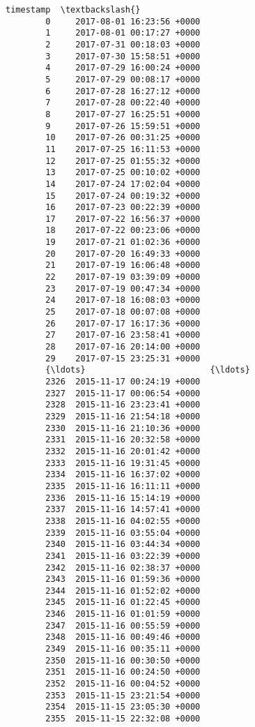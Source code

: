 \documentclass[11pt]{article}
\begin{document}
\begin{Verbatim}[commandchars=\\\{\}]
                              timestamp  \textbackslash{}
        0     2017-08-01 16:23:56 +0000   
        1     2017-08-01 00:17:27 +0000   
        2     2017-07-31 00:18:03 +0000   
        3     2017-07-30 15:58:51 +0000   
        4     2017-07-29 16:00:24 +0000   
        5     2017-07-29 00:08:17 +0000   
        6     2017-07-28 16:27:12 +0000   
        7     2017-07-28 00:22:40 +0000   
        8     2017-07-27 16:25:51 +0000   
        9     2017-07-26 15:59:51 +0000   
        10    2017-07-26 00:31:25 +0000   
        11    2017-07-25 16:11:53 +0000   
        12    2017-07-25 01:55:32 +0000   
        13    2017-07-25 00:10:02 +0000   
        14    2017-07-24 17:02:04 +0000   
        15    2017-07-24 00:19:32 +0000   
        16    2017-07-23 00:22:39 +0000   
        17    2017-07-22 16:56:37 +0000   
        18    2017-07-22 00:23:06 +0000   
        19    2017-07-21 01:02:36 +0000   
        20    2017-07-20 16:49:33 +0000   
        21    2017-07-19 16:06:48 +0000   
        22    2017-07-19 03:39:09 +0000   
        23    2017-07-19 00:47:34 +0000   
        24    2017-07-18 16:08:03 +0000   
        25    2017-07-18 00:07:08 +0000   
        26    2017-07-17 16:17:36 +0000   
        27    2017-07-16 23:58:41 +0000   
        28    2017-07-16 20:14:00 +0000   
        29    2017-07-15 23:25:31 +0000   
        {\ldots}                         {\ldots}   
        2326  2015-11-17 00:24:19 +0000   
        2327  2015-11-17 00:06:54 +0000   
        2328  2015-11-16 23:23:41 +0000   
        2329  2015-11-16 21:54:18 +0000   
        2330  2015-11-16 21:10:36 +0000   
        2331  2015-11-16 20:32:58 +0000   
        2332  2015-11-16 20:01:42 +0000   
        2333  2015-11-16 19:31:45 +0000   
        2334  2015-11-16 16:37:02 +0000   
        2335  2015-11-16 16:11:11 +0000   
        2336  2015-11-16 15:14:19 +0000   
        2337  2015-11-16 14:57:41 +0000   
        2338  2015-11-16 04:02:55 +0000   
        2339  2015-11-16 03:55:04 +0000   
        2340  2015-11-16 03:44:34 +0000   
        2341  2015-11-16 03:22:39 +0000   
        2342  2015-11-16 02:38:37 +0000   
        2343  2015-11-16 01:59:36 +0000   
        2344  2015-11-16 01:52:02 +0000   
        2345  2015-11-16 01:22:45 +0000   
        2346  2015-11-16 01:01:59 +0000   
        2347  2015-11-16 00:55:59 +0000   
        2348  2015-11-16 00:49:46 +0000   
        2349  2015-11-16 00:35:11 +0000   
        2350  2015-11-16 00:30:50 +0000   
        2351  2015-11-16 00:24:50 +0000   
        2352  2015-11-16 00:04:52 +0000   
        2353  2015-11-15 23:21:54 +0000   
        2354  2015-11-15 23:05:30 +0000   
        2355  2015-11-15 22:32:08 +0000   
        

\end{Verbatim}
\end{document}

